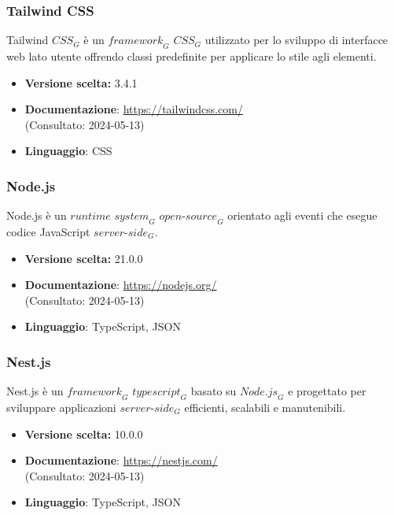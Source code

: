 \subsubsection{Tailwind CSS}
Tailwind $\textit{CSS}_G$ è un $\textit{framework}_G$ $\textit{CSS}_G$ utilizzato per lo sviluppo di interfacce web lato utente offrendo classi predefinite per applicare lo stile agli elementi.
\begin{itemize}
    \item \textbf{Versione scelta:} 3.4.1
    \item \textbf{Documentazione}: \url{https://tailwindcss.com/}\\
    (Consultato: 2024-05-13)
    \item \textbf{Linguaggio}: CSS
\end{itemize}

\subsubsection{Node.js}
Node.js è un $\textit{runtime system}_G$ $\textit{open-source}_G$ orientato agli eventi che esegue codice JavaScript $\textit{server-side}_G$.

\begin{itemize}
    \item \textbf{Versione scelta:} 21.0.0
    \item \textbf{Documentazione}: \url{https://nodejs.org/}\\
    (Consultato: 2024-05-13)
    \item \textbf{Linguaggio}: TypeScript, JSON
\end{itemize}

\subsubsection{Nest.js}
Nest.js è un $\textit{framework}_G$ $\textit{typescript}_G$ basato su $\textit{Node.js}_G$ e progettato per sviluppare applicazioni $\textit{server-side}_G$ efficienti, scalabili e manutenibili. 

\begin{itemize}
    \item \textbf{Versione scelta:} 10.0.0
    \item \textbf{Documentazione}: \url{https://nestjs.com/}\\
    (Consultato: 2024-05-13)
    \item \textbf{Linguaggio}: TypeScript, JSON
\end{itemize}

